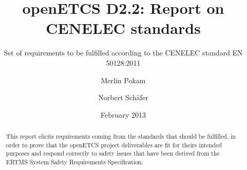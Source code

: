 \documentclass{template/openetcs_report}
\begin{document}
\frontmatter
{}




\title{openETCS D2.2: Report on CENELEC standards}

\subtitle{Set of requirements to be fulfilled according to the CENELEC standard EN 50128:2011}

\date{February 2013}

\author{Merlin Pokam \and Norbert Sch\"afer}






\begin{abstract}
This report elicits requirements coming from the standards that should be fulfilled, in order to prove that the openETCS project deliverables are fit for theirs intended purposes and respond correctly to safety issues that have been derived from the ERTMS System Safety Requirements Specification.

\end{abstract}

\maketitle
\tableofcontents
\listoffiguresandtables



\end{document}
